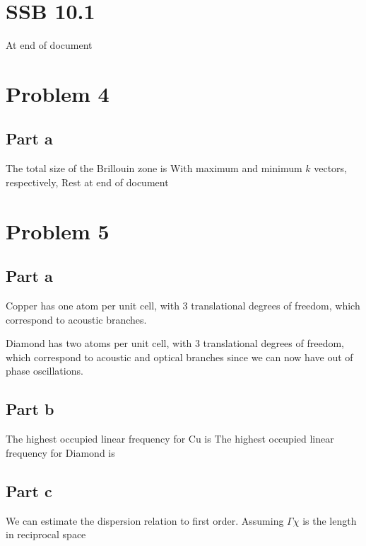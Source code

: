 \section*{SSB 10.1}
At end of document

\section*{Problem 4}
\subsection*{Part a}
The total size of the Brillouin zone is
With maximum and minimum $k$ vectors, respectively,
Rest at end of document

\section*{Problem 5}
\subsection*{Part a}
Copper has one atom per unit cell, with 3 translational degrees of freedom, which correspond to acoustic branches.

Diamond has two atoms per unit cell, with 3 translational degrees of freedom, which correspond to acoustic and optical branches since we can now have out of phase oscillations.

\subsection*{Part b}
The highest occupied linear frequency for Cu is
The highest occupied linear frequency for Diamond is
\subsection*{Part c}
We can estimate the dispersion relation to first order. Assuming $\Gamma \chi$ is the length in reciprocal space
